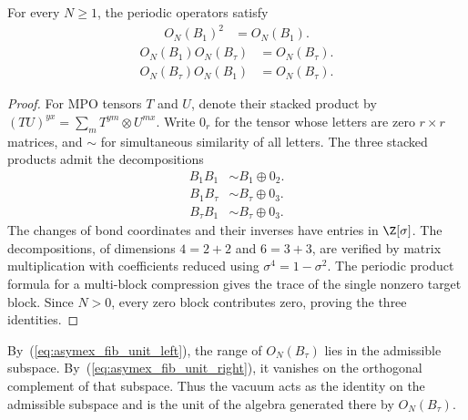 \begin{lemma}
    \label{thm:asymex_fib_unit}
    \leanok
    For every $N\geq1$, the periodic operators satisfy
    \begin{align}
        O_N(B_1)^2 & =O_N(B_1).
        \label{eq:asymex_fib_unit_square}
    \end{align}
    \begin{align}
        O_N(B_1)O_N(B_\tau) & =O_N(B_\tau).
        \label{eq:asymex_fib_unit_left}
    \end{align}
    \begin{align}
        O_N(B_\tau)O_N(B_1) & =O_N(B_\tau).
        \label{eq:asymex_fib_unit_right}
    \end{align}
\end{lemma}

\begin{proof}
    \leanok
    For MPO tensors $T$ and $U$, denote their stacked product by
    $(TU)^{yx}=\sum_mT^{ym}\otimes U^{mx}$.
    Write $0_r$ for the tensor whose letters are zero $r\times r$
    matrices, and $\sim$ for simultaneous similarity of all letters.
    The three stacked products admit the decompositions
    \begin{align}
        B_1B_1 & \sim B_1\oplus0_2.
        \label{eq:asymex_fib_unit_blocks}
    \end{align}
    \begin{align}
        B_1B_\tau & \sim B_\tau\oplus0_3.
    \end{align}
    \begin{align}
        B_\tau B_1 & \sim B_\tau\oplus0_3.
    \end{align}
    The changes of bond coordinates and their inverses have entries
    in $\Z[\sigma]$. The decompositions, of dimensions $4=2+2$ and
    $6=3+3$, are verified by matrix multiplication with coefficients
    reduced using $\sigma^4=1-\sigma^2$.
    The periodic product formula for a multi-block compression gives
    the trace of the single nonzero target block. Since $N>0$, every
    zero block contributes zero, proving the three identities.
\end{proof}

By~(\ref{eq:asymex_fib_unit_left}), the range of $O_N(B_\tau)$ lies in
the admissible subspace. By~(\ref{eq:asymex_fib_unit_right}), it vanishes
on the orthogonal complement of that subspace. Thus the vacuum acts
as the identity on the admissible subspace and is the unit of the
algebra generated there by $O_N(B_\tau)$.

